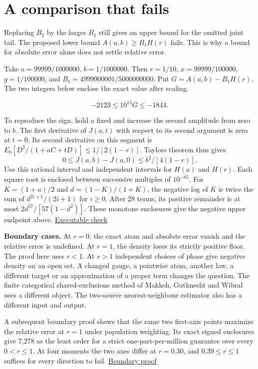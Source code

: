 \section{A comparison that fails}\label{a-comparison-that-fails}

Replacing \(B_2\) by the larger \(B_1\) still gives an upper bound for the omitted joint tail. The proposed lower bound \(A(a,b)\ge B_1H(r)\) fails. This is why a bound for absolute error alone does not settle relative error.

Take \(a=99999/1000000\), \(b=1/1000000\). Then \(r=1/10\), \(x=99999/100000\), \(y=1/100000\), and \(B_1=4999900001/5000000000\). Put \(G=A(a,b)-B_1H(r)\). The two integers below enclose the exact value after scaling.

\[
-2123 \le 10^{15}G \le -1844.
\]

To reproduce the sign, hold \(a\) fixed and increase the second amplitude from zero to \(b\). The first derivative of \(J(a,t)\) with respect to its second argument is zero at \(t=0\). Its second derivative on this segment is \(E_0[D^2/(1+aC+tD)]\le1/[2(1-r)]\). Taylor\textquotesingle s theorem thus gives \[
0\le J(a,b)-J(a,0)\le b^2/[4(1-r)] .
\] Use this rational interval and independent intervals for \(H(a)\) and \(H(r)\). Each square root is enclosed between successive multiples of \(10^{-65}\). For \(K=(1+u)/2\) and \(d=(1-K)/(1+K)\), the negative log of \(K\) is twice the sum of \(d^{2i+1}/(2i+1)\) for \(i\ge0\). After 28 terms, its positive remainder is at most \(2d^{57}/[57(1-d^2)]\). These monotone enclosures give the negative upper endpoint above. \href{https://github.com/sepahead/pid-rs/blob/main/audit/research/angular-truncation-extremum/closed_form.py}{Executable check}

\textbf{Boundary cases.} At \(r=0\), the exact atom and absolute error vanish and the relative error is undefined. At \(r=1\), the density loses its strictly positive floor. The proof here uses \(r<1\). At \(r>1\) independent choices of phase give negative density on an open set. A changed gauge, a pointwise atom, another law, a different target or an approximation of a proper term changes the question. The finite categorical shared-exclusions method of Makkeh, Gutknecht and Wibral uses a different object. The two-source nearest-neighbour estimator also has a different input and output.

A subsequent boundary proof shows that the same two first-axis points maximize the relative error at \(r=1\) under population weighting. Its exact signed enclosures give 7,278 as the least order for a strict one-part-per-million guarantee over every \(0<r\le1\). At four moments the two axes differ at \(r=0.30\), and \(0.39\le r\le1\) suffices for every direction to fail. \href{https://github.com/sepahead/pid-rs/blob/main/audit/research/angular-unit-boundary/EXPOSITION.md}{Boundary proof}

